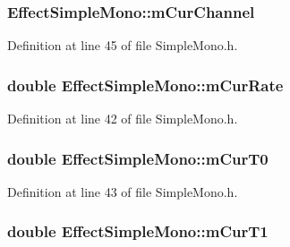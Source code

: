 \subsubsection[{\texorpdfstring{m\+Cur\+Channel}{mCurChannel}}]{ Effect\+Simple\+Mono\+::m\+Cur\+Channel\hspace{0.3cm}{\ttfamily [protected]}}\hypertarget{class_effect_simple_mono_aa1fcb140a38c6df032988cbb1410123f}{}\label{class_effect_simple_mono_aa1fcb140a38c6df032988cbb1410123f}


Definition at line 45 of file Simple\+Mono.\+h.

\subsubsection[{\texorpdfstring{m\+Cur\+Rate}{mCurRate}}]{\setlength{\rightskip}{0pt plus 5cm}double Effect\+Simple\+Mono\+::m\+Cur\+Rate\hspace{0.3cm}{\ttfamily [protected]}}\hypertarget{class_effect_simple_mono_aed4b321d5b7f4efd6dc11f1e64989629}{}\label{class_effect_simple_mono_aed4b321d5b7f4efd6dc11f1e64989629}


Definition at line 42 of file Simple\+Mono.\+h.

\subsubsection[{\texorpdfstring{m\+Cur\+T0}{mCurT0}}]{\setlength{\rightskip}{0pt plus 5cm}double Effect\+Simple\+Mono\+::m\+Cur\+T0\hspace{0.3cm}{\ttfamily [protected]}}\hypertarget{class_effect_simple_mono_a75fecc2a0d112702d8276f59011d95fe}{}\label{class_effect_simple_mono_a75fecc2a0d112702d8276f59011d95fe}


Definition at line 43 of file Simple\+Mono.\+h.

\subsubsection[{\texorpdfstring{m\+Cur\+T1}{mCurT1}}]{\setlength{\rightskip}{0pt plus 5cm}double Effect\+Simple\+Mono\+::m\+Cur\+T1\hspace{0.3cm}{\ttfamily [protected]}}\hypertarget{class_effect_simple_mono_a9e1c996c09d385cb6ee67f2af4d5175b}{}\label{class_effect_simple_mono_a9e1c996c09d385cb6ee67f2af4d5175b}


